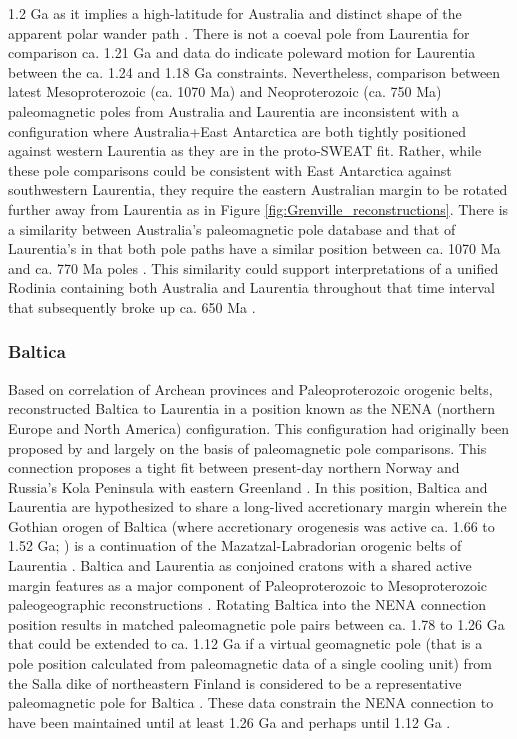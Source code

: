 \documentclass[twocolumn, switch]{article} %
\begin{document}
1.2 Ga as it implies a high-latitude for Australia and distinct shape of the apparent polar wander path \citep{Pisarevsky2014a}. There is not a coeval pole from Laurentia for comparison ca. 1.21 Ga and data do indicate poleward motion for Laurentia between the ca. 1.24 and 1.18 Ga constraints. Nevertheless, comparison between latest Mesoproterozoic (ca. 1070 Ma) and Neoproterozoic (ca. 750 Ma) paleomagnetic poles from Australia and Laurentia are inconsistent with a configuration where Australia+East Antarctica are both tightly positioned against western Laurentia as they are in the proto-SWEAT fit. Rather, while these pole comparisons could be consistent with East Antarctica against southwestern Laurentia, they require the eastern Australian margin to be rotated further away from Laurentia as in Figure \ref{fig:Grenville_reconstructions}. There is a similarity between Australia's paleomagnetic pole database and that of Laurentia's in that both pole paths have a similar position between ca. 1070 Ma and ca. 770 Ma poles \citep{Swanson-Hysell2012a}. This similarity could support interpretations of a unified Rodinia containing both Australia and Laurentia throughout that time interval \citep{Swanson-Hysell2012a} that subsequently broke up ca. 650 Ma \citep{Li2011a}.

\subsubsection{Baltica}

Based on correlation of Archean provinces and Paleoproterozoic orogenic belts, \cite{Gower1990a} reconstructed Baltica to Laurentia in a position known as the NENA (northern Europe and North America) configuration. This configuration had originally been proposed by \citet{Patchett1978a} and \citet{Piper1980a} largely on the basis of paleomagnetic pole comparisons. This connection proposes a tight fit between present-day northern Norway and Russia's Kola Peninsula with eastern Greenland \citep{Gower1990a, Salminen2021b}. In this position, Baltica and Laurentia are hypothesized to share a long-lived accretionary margin wherein the Gothian orogen of Baltica (where accretionary orogenesis was active ca. 1.66 to 1.52 Ga; \citealp{Bergstrom2020a}) is a continuation of the Mazatzal-Labradorian orogenic belts of Laurentia \citep{Karlstrom2001a}. Baltica and Laurentia as conjoined cratons with a shared active margin features as a major component of Paleoproterozoic to Mesoproterozoic paleogeographic reconstructions \citep{Evans2011a, Zhang2012a, Elming2021a}. Rotating Baltica into the NENA connection position results in matched paleomagnetic pole pairs between ca. 1.78 to 1.26 Ga \citep{Buchan2000a, Evans2008a, Swanson-Hysell2021a} that could be extended to ca. 1.12 Ga if a virtual geomagnetic pole (that is a pole position calculated from paleomagnetic data of a single cooling unit) from the Salla dike of northeastern Finland is considered to be a representative paleomagnetic pole for Baltica \citep{Salminen2009b}. These data constrain the NENA connection to have been maintained until at least 1.26 Ga and perhaps until 1.12 Ga \citep{Salminen2021b}. 
\end{document}
